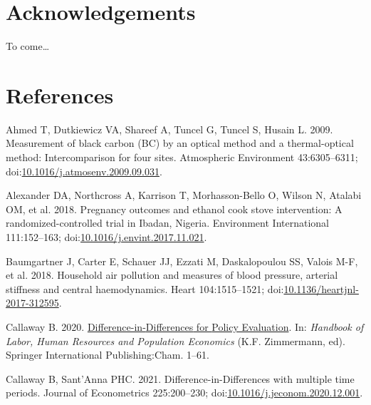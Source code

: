 \documentclass[
  letterpaper,
  DIV=11,
  numbers=noendperiod]{scrartcl}
\newlength{\cslhangindent}
\newlength{\cslentryspacingunit} %
\newenvironment{CSLReferences}[2] %
 {%
  \setlength{\parindent}{0pt}
  \ifodd #1
  \let\oldpar\par
  \def\par{\hangindent=\cslhangindent\oldpar}
  \fi
  \setlength{\parskip}{#2\cslentryspacingunit}
 }%
 {}
\begin{document}
\hypertarget{acknowledgements}{%
\section{Acknowledgements}\label{acknowledgements}}

To come\ldots{}

\hypertarget{references}{%
\section{References}\label{references}}

\hypertarget{refs}{}
\begin{CSLReferences}{1}{0}
\leavevmode{}%
Ahmed T, Dutkiewicz VA, Shareef A, Tuncel G, Tuncel S, Husain L. 2009.
Measurement of black carbon ({BC}) by an optical method and a
thermal-optical method: {Intercomparison} for four sites. Atmospheric
Environment 43:6305--6311;
doi:\href{https://doi.org/10.1016/j.atmosenv.2009.09.031}{10.1016/j.atmosenv.2009.09.031}.

\leavevmode{}%
Alexander DA, Northcross A, Karrison T, Morhasson-Bello O, Wilson N,
Atalabi OM, et al. 2018. Pregnancy outcomes and ethanol cook stove
intervention: {A} randomized-controlled trial in {Ibadan}, {Nigeria}.
Environment International 111:152--163;
doi:\href{https://doi.org/10.1016/j.envint.2017.11.021}{10.1016/j.envint.2017.11.021}.

\leavevmode{}%
Baumgartner J, Carter E, Schauer JJ, Ezzati M, Daskalopoulou SS, Valois
M-F, et al. 2018. Household air pollution and measures of blood
pressure, arterial stiffness and central haemodynamics. Heart
104:1515--1521;
doi:\href{https://doi.org/10.1136/heartjnl-2017-312595}{10.1136/heartjnl-2017-312595}.

\leavevmode{}%
Callaway B. 2020.
\href{https://doi.org/10.1007/978-3-319-57365-6_352-1}{Difference-in-{Differences}
for {Policy Evaluation}}. In: \emph{Handbook of {Labor}, {Human
Resources} and {Population Economics}} (K.F. Zimmermann, ed). Springer
International Publishing:Cham. 1--61.

\leavevmode{}%
Callaway B, Sant'Anna PHC. 2021. Difference-in-{Differences} with
multiple time periods. Journal of Econometrics 225:200--230;
doi:\href{https://doi.org/10.1016/j.jeconom.2020.12.001}{10.1016/j.jeconom.2020.12.001}.


\end{CSLReferences}
\end{document}
